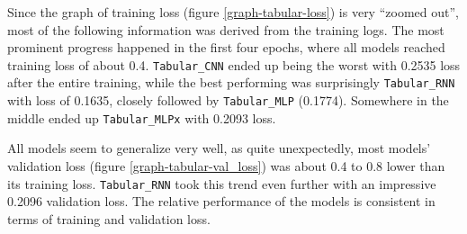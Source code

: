 Since the graph of training loss (figure \ref{graph-tabular-loss}) is very ``zoomed out'', most of the following information was derived from
the training logs. The most prominent progress happened in the first four epochs, where all models
reached training loss of about 0.4.
\texttt{Tabular\_CNN} ended up being the worst with 0.2535 loss after the entire training, while the best performing
was surprisingly \texttt{Tabular\_RNN} with loss of 0.1635, closely followed by \texttt{Tabular\_MLP} (0.1774).
Somewhere in the middle ended up \texttt{Tabular\_MLPx} with 0.2093 loss.

All models seem to generalize very well, as quite unexpectedly, most models' validation loss (figure
\ref{graph-tabular-val_loss}) was about 0.4 to 0.8 lower than
its training loss. \texttt{Tabular\_RNN} took this trend even further with an impressive 0.2096 validation loss.
The relative performance of the models is consistent in terms of training and validation loss.
\pagebreak


